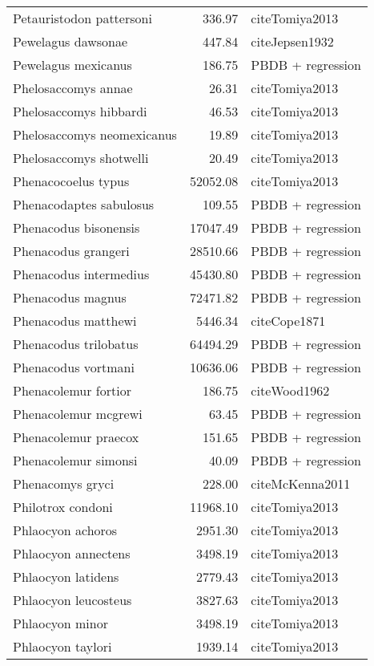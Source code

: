 \begin{table}[ht]
\begin{tabular}{lrl}
  Petauristodon pattersoni & 336.97 & cite{Tomiya2013} \\ 
  Pewelagus dawsonae & 447.84 & cite{Jepsen1932} \\ 
  Pewelagus mexicanus & 186.75 & PBDB + regression \\ 
  Phelosaccomys annae & 26.31 & cite{Tomiya2013} \\ 
  Phelosaccomys hibbardi & 46.53 & cite{Tomiya2013} \\ 
  Phelosaccomys neomexicanus & 19.89 & cite{Tomiya2013} \\ 
  Phelosaccomys shotwelli & 20.49 & cite{Tomiya2013} \\ 
  Phenacocoelus typus & 52052.08 & cite{Tomiya2013} \\ 
  Phenacodaptes sabulosus & 109.55 & PBDB + regression \\ 
  Phenacodus bisonensis & 17047.49 & PBDB + regression \\ 
  Phenacodus grangeri & 28510.66 & PBDB + regression \\ 
  Phenacodus intermedius & 45430.80 & PBDB + regression \\ 
  Phenacodus magnus & 72471.82 & PBDB + regression \\ 
  Phenacodus matthewi & 5446.34 & cite{Cope1871} \\ 
  Phenacodus trilobatus & 64494.29 & PBDB + regression \\ 
  Phenacodus vortmani & 10636.06 & PBDB + regression \\ 
  Phenacolemur fortior & 186.75 & cite{Wood1962} \\ 
  Phenacolemur mcgrewi & 63.45 & PBDB + regression \\ 
  Phenacolemur praecox & 151.65 & PBDB + regression \\ 
  Phenacolemur simonsi & 40.09 & PBDB + regression \\ 
  Phenacomys gryci & 228.00 & cite{McKenna2011} \\ 
  Philotrox condoni & 11968.10 & cite{Tomiya2013} \\ 
  Phlaocyon achoros & 2951.30 & cite{Tomiya2013} \\ 
  Phlaocyon annectens & 3498.19 & cite{Tomiya2013} \\ 
  Phlaocyon latidens & 2779.43 & cite{Tomiya2013} \\ 
  Phlaocyon leucosteus & 3827.63 & cite{Tomiya2013} \\ 
  Phlaocyon minor & 3498.19 & cite{Tomiya2013} \\ 
  Phlaocyon taylori & 1939.14 & cite{Tomiya2013} \\ 

\end{tabular}
\end{table}
